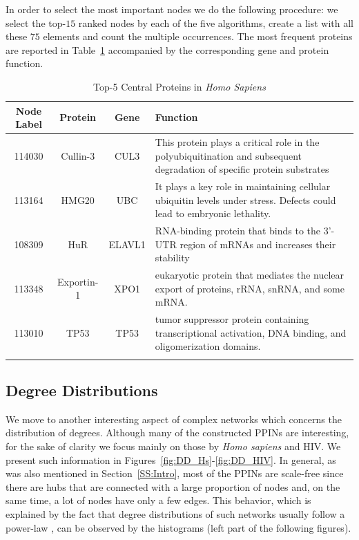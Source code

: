 In order to select the most important nodes we do the following procedure: we select the top-$15$ ranked nodes by each of the five algorithms, create a list with all these $75$ elements and count the multiple occurrences. The most frequent proteins are reported in Table~\ref{tab:central} accompanied by the corresponding gene and protein function. 


\begin{table}[h]%
	\centering
	\caption{Top-5 Central Proteins in \textit{Homo Sapiens}}
	\begin{tabular}{cccl}
		Node Label & Protein & Gene & Function \\
		\midrule
		114030 & Cullin-3 & CUL3 & This protein plays a critical role in the polyubiquitination and subsequent degradation of specific protein substrates \\
		113164 & HMG20 &  UBC & It plays a key role in maintaining cellular ubiquitin levels under stress. Defects could lead to embryonic lethality. \\
		108309 & HuR & ELAVL1 & RNA-binding protein that binds to the 3'-UTR region of mRNAs and increases their stability \\
		113348 & Exportin-1 & XPO1 &  eukaryotic protein that mediates the nuclear export of proteins, rRNA, snRNA, and some mRNA. \\
		113010 & TP53 & TP53 & tumor suppressor protein containing transcriptional activation, DNA binding, and oligomerization domains.  \\
        \bottomrule
		\label{tab:central}
	\end{tabular}
\end{table}

\subsection{Degree Distributions}

We move to another interesting aspect of complex networks which concerns the distribution of degrees. Although many of the constructed PPINs are interesting, for the sake of clarity we focus mainly on those by \textit{Homo sapiens} and HIV. We present such information in Figures~\ref{fig:DD_Hs}-\ref{fig:DD_HIV}. In general, as was also mentioned in Section~\ref{SS:Intro}, most of the PPINs are scale-free since there are hubs that are connected with a large proportion of nodes and, on the same time, a lot of nodes have only a few edges. This behavior, which is explained by the fact that degree distributions of such networks usually follow a power-law \cite{barabasi2003scale}, can be observed by the histograms (left part of the following figures).  

